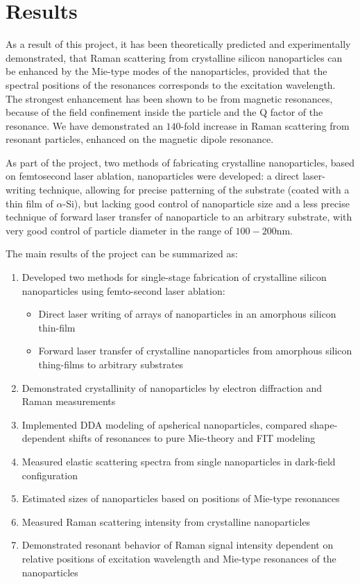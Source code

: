 \section*{Results}
    As a result of this project, it has been theoretically predicted and experimentally demonstrated, that Raman scattering
    from crystalline silicon nanoparticles can be enhanced by the Mie-type modes of the nanoparticles, provided that the
    spectral positions of the resonances corresponds to the excitation wavelength. The strongest enhancement has been shown
    to be from magnetic resonances, because of the field confinement inside the particle and the Q factor of the resonance.
    We have demonstrated an $140$-fold increase in Raman scattering from resonant particles, enhanced on the magnetic dipole
    resonance.

    As part of the project, two methods of fabricating crystalline nanoparticles, based on femtosecond laser ablation,
    nanoparticles were developed: a direct laser-writing technique, allowing for precise patterning of the substrate
    (coated with a thin film of $\alpha$-Si), but lacking good control of nanoparticle size and a less precise technique
    of forward laser transfer of nanoparticle to an arbitrary substrate, with very good control of particle diameter in the
    range of $100-200$nm.


    The main results of the project can be summarized as:
    \begin{enumerate}
        \item Developed two methods for single-stage fabrication of crystalline silicon nanoparticles using femto-second laser ablation:
            \begin{itemize}
                \item Direct laser writing of arrays of nanoparticles in an amorphous silicon thin-film
                \item Forward laser transfer of crystalline nanoparticles from amorphous silicon thing-films to arbitrary substrates
            \end{itemize}
        \item Demonstrated crystallinity of nanoparticles by electron diffraction and Raman measurements
        \item Implemented DDA modeling of apsherical nanoparticles, compared shape-dependent shifts of resonances to pure Mie-theory
            and FIT modeling
        \item Measured elastic scattering spectra from single nanoparticles in dark-field configuration
        \item Estimated sizes of nanoparticles based on positions of Mie-type resonances
        \item Measured Raman scattering intensity from crystalline nanoparticles
        \item Demonstrated resonant behavior of Raman signal intensity dependent on relative positions of excitation wavelength and Mie-type resonances
            of the nanoparticles
    \end{enumerate}

